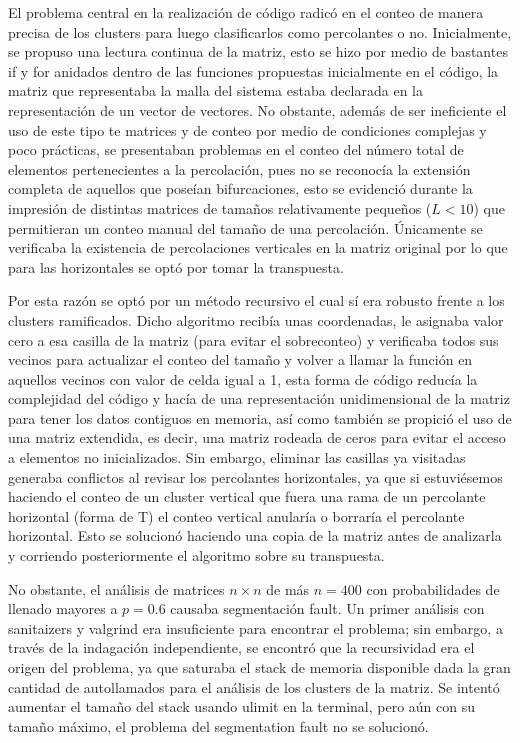 \documentclass{article}
\begin{document}
\begin{multicols}{2}
El problema central en la realización de código radicó en el conteo de manera precisa de los clusters para luego clasificarlos como percolantes o no. Inicialmente, se propuso una lectura  continua de la matriz, esto se hizo por medio de bastantes if y for anidados dentro de las funciones propuestas inicialmente en el código, la matriz que representaba la malla del sistema estaba declarada en la representación de un vector de vectores. No obstante, además de ser ineficiente el uso de este tipo te matrices y de conteo por medio de condiciones complejas y poco prácticas, se presentaban problemas en el conteo del número total de elementos pertenecientes a la percolación, pues no se reconocía la extensión completa de aquellos que poseían bifurcaciones, esto se evidenció durante la impresión de distintas matrices de tamaños relativamente pequeños ($L<10$) que permitieran un conteo manual del tamaño de una percolación.  Únicamente se verificaba la existencia de percolaciones verticales en la matriz original por lo que para las horizontales se optó por tomar la transpuesta.

Por esta razón se optó por un método recursivo el cual sí era robusto frente a los clusters ramificados. Dicho algoritmo recibía unas coordenadas, le asignaba valor cero a esa casilla de la matriz (para evitar el sobreconteo) y verificaba todos sus vecinos para actualizar el conteo del tamaño y volver a llamar la función en aquellos vecinos con valor de celda igual a 1, esta forma de código reducía la complejidad del código y hacía de una representación unidimensional de la matriz para tener los datos contiguos en memoria, así como también se propició el uso de una matriz extendida, es decir, una matriz rodeada de ceros para evitar el acceso a elementos no inicializados. Sin embargo, eliminar las casillas ya visitadas generaba conflictos al revisar los percolantes horizontales, ya que si estuviésemos haciendo el conteo de un cluster vertical que fuera una rama de un percolante horizontal (forma de T) el conteo vertical anularía o borraría el percolante horizontal. Esto se solucionó haciendo una copia de la matriz antes de analizarla y corriendo posteriormente el algoritmo sobre su transpuesta.

No obstante, el análisis de matrices $n\times n$ de más $n=400$ con probabilidades de llenado mayores a $p=0.6$ causaba segmentación fault. Un primer análisis con sanitaizers y valgrind era insuficiente para encontrar el problema; sin embargo, a través de la indagación independiente, se encontró que la  recursividad era el origen del problema, ya que saturaba el stack de memoria disponible dada la gran cantidad de autollamados para el análisis de los clusters de la matriz. Se intentó aumentar el tamaño del stack usando ulimit en la terminal, pero aún con su tamaño máximo, el problema del segmentation fault no se solucionó.  


\end{multicols}
\end{document}
